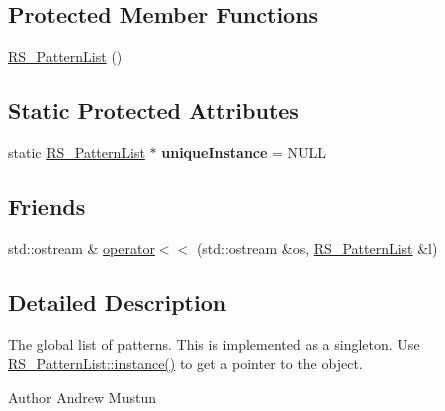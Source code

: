 \subsection*{Protected Member Functions}
\begin{DoxyCompactItemize}
\item 
\hyperlink{classRS__PatternList_ad59bf13b4525f8f90952694c51fd6208}{R\-S\-\_\-\-Pattern\-List} ()
\end{DoxyCompactItemize}
\subsection*{Static Protected Attributes}
\begin{DoxyCompactItemize}
\item 
\hypertarget{classRS__PatternList_a5a7d402bdd983e09c94e81f20343d0e7}{static \hyperlink{classRS__PatternList}{R\-S\-\_\-\-Pattern\-List} $\ast$ {\bfseries unique\-Instance} = N\-U\-L\-L}\label{classRS__PatternList_a5a7d402bdd983e09c94e81f20343d0e7}

\end{DoxyCompactItemize}
\subsection*{Friends}
\begin{DoxyCompactItemize}
\item 
std\-::ostream \& \hyperlink{classRS__PatternList_a4a61c36eeb16baa8f44364a80313c15e}{operator$<$$<$} (std\-::ostream \&os, \hyperlink{classRS__PatternList}{R\-S\-\_\-\-Pattern\-List} \&l)
\end{DoxyCompactItemize}


\subsection{Detailed Description}
The global list of patterns. This is implemented as a singleton. Use \hyperlink{classRS__PatternList_a1ddd2ff7072f76366b329db77baa535b}{R\-S\-\_\-\-Pattern\-List\-::instance()} to get a pointer to the object.

\begin{DoxyAuthor}{Author}
Andrew Mustun 
\end{DoxyAuthor}


